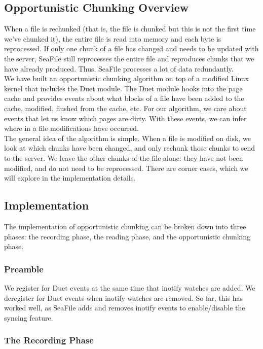 \documentclass[table]{article}
\begin{document}
\begin{multicols}{2}
\subsection{Opportunistic Chunking Overview}

When a file is rechunked (that is, the file is chunked but this is not the first time we've chunked it), the entire file is read into memory and each byte is reprocessed. If only one chunk of a file has changed and needs to be updated with the server, SeaFile still reprocesses the entire file and reproduces chunks that we have already produced. Thus, SeaFile processes a lot of data redundantly.\\

We have built an opportunistic chunking algorithm on top of a modified Linux kernel that includes the Duet module. The Duet module hooks into the page cache and provides events about what blocks of a file have been added to the cache, modified, flushed from the cache, etc. For our algorithm, we care about events that let us know which pages are dirty. With these events, we can infer where in a file modifications have occurred.\\

The general idea of the algorithm is simple. When a file is modified on disk, we look at which chunks have been changed, and only rechunk those chunks to send to the server. We leave the other chunks of the file alone: they have not been modified, and do not need to be reprocessed. There are corner cases, which we will explore in the implementation details.

\subsection{Implementation}

The implementation of opportunistic chunking can be broken down into three phases: the recording phase, the reading phase, and the opportunistic chunking phase.

\subsubsection{Preamble}

We register for Duet events at the same time that inotify watches are added. We deregister for Duet events when inotify watches are removed. So far, this has worked well, as SeaFile adds and removes inotify events to enable/disable the syncing feature.

\subsubsection{The Recording Phase}


\end{multicols}
\end{document}
